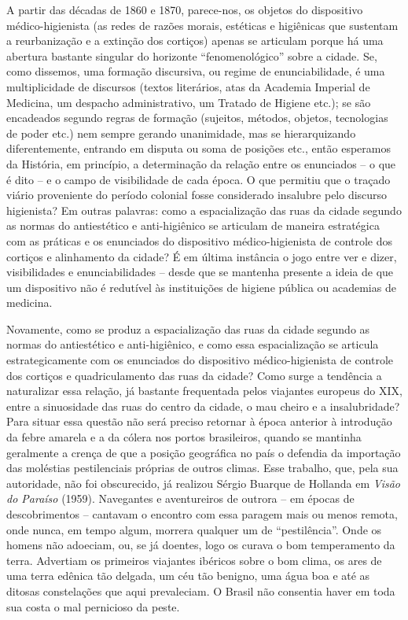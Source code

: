 A partir das décadas de 1860 e 1870, parece-nos, os objetos do
dispositivo médico-higienista (as redes de razões morais, estéticas e
higiênicas que sustentam a reurbanização e a extinção dos cortiços)
apenas se articulam porque há uma abertura bastante singular do
horizonte ``fenomenológico'' sobre a cidade. Se, como dissemos, uma
formação discursiva, ou regime de enunciabilidade, é uma multiplicidade
de discursos (textos literários, atas da Academia Imperial de Medicina,
um despacho administrativo, um Tratado de Higiene etc.); se são
encadeados segundo regras de formação (sujeitos, métodos, objetos,
tecnologias de poder etc.) nem sempre gerando unanimidade, mas se
hierarquizando diferentemente, entrando em disputa ou soma de posições
etc., então esperamos da História, em princípio, a determinação da
relação entre os enunciados -- o que é dito -- e o campo de visibilidade
de cada época. O que permitiu que o traçado viário proveniente do
período colonial fosse considerado insalubre pelo discurso higienista?
Em outras palavras: como a espacialização das ruas da cidade segundo as
normas do antiestético e anti-higiênico se articulam de maneira
estratégica com as práticas e os enunciados do dispositivo
médico-higienista de controle dos cortiços e alinhamento da cidade? É em
última instância o jogo entre ver e dizer, visibilidades e
enunciabilidades -- desde que se mantenha presente a ideia de que um
dispositivo não é redutível às instituições de higiene pública ou
academias de medicina.

Novamente, como se produz a espacialização das ruas da cidade segundo as
normas do antiestético e anti-higiênico, e como essa espacialização se
articula estrategicamente com os enunciados do dispositivo
médico-higienista de controle dos cortiços e quadriculamento das ruas da
cidade? Como surge a tendência a naturalizar essa relação, já bastante
frequentada pelos viajantes europeus do XIX, entre a sinuosidade das
ruas do centro da cidade, o mau cheiro e a insalubridade? Para situar
essa questão não será preciso retornar à época anterior à introdução da
febre amarela e a da cólera nos portos brasileiros, quando se mantinha
geralmente a crença de que a posição geográfica no país o defendia da
importação das moléstias pestilenciais próprias de outros climas. Esse
trabalho, que, pela sua autoridade, não foi obscurecido, já realizou
Sérgio Buarque de Hollanda em \emph{Visão do Paraíso} (1959). Navegantes
e aventureiros de outrora -- em épocas de descobrimentos -- cantavam o
encontro com essa paragem mais ou menos remota, onde nunca, em tempo
algum, morrera qualquer um de ``pestilência''. Onde os homens não
adoeciam, ou, se já doentes, logo os curava o bom temperamento da terra.
Advertiam os primeiros viajantes ibéricos sobre o bom clima, os ares de
uma terra edênica tão delgada, um céu tão benigno, uma água boa e até as
ditosas constelações que aqui prevaleciam. O Brasil não consentia haver
em toda sua costa o mal pernicioso da peste.

